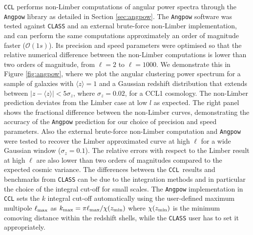 \documentclass[\docopts]{\docclass}
\newcommand{\ccl}{{\tt CCL}\xspace}
\newcommand{\class}{{\tt CLASS}\xspace}
\begin{document}
\ccl performs non-Limber computations of angular power spectra through the {\tt Angpow} library as detailed in Section \ref{sec:angpow}. The \texttt{Angpow} software was tested against \class and an external brute-force non-Limber implementation, and can perform the same computations approximately an order of magnitude faster ($\mathcal{O}(1s)$). Its precision and speed parameters were optimised so that the relative numerical difference between the non-Limber computations is lower than two orders of magnitude, from $\ell=2$ to $\ell=1000$. We demonstrate this in Figure \ref{fig:angpow}, where we plot the angular clustering power spectrum for a sample of galaxies with $\langle z \rangle=1$ and a Gaussian redshift distribution that extends between $|z-\langle z \rangle|<5\sigma_z$, where $\sigma_z=0.02$, for a CCL1 cosmology. The non-Limber prediction deviates from the Limber case at low $l$ as expected. The right panel shows the fractional difference between the non-Limber curves, demonstrating the accuracy of the {\tt Angpow} prediction for our choice of precision and speed parameters. Also the external brute-force non-Limber computation and {\tt Angpow} were tested to recover the Limber approximated curve at high $\ell$ for a wide Gaussian window ($\sigma_z=0.1$). The relative errors with respect to the Limber result at high $\ell$ are also lower than two orders of magnitudes compared to the expected cosmic variance. The differences between the \ccl~results and benchmarks from \class can be due to the integration methods and in particular the choice of the integral cut-off for small scales. The {\tt Angpow} implementation in \ccl sets the $k$ integral cut-off automatically using the user-defined maximum multipole $\ell_{\rm max}$ as $k_{\rm max}=\pi \ell_{\rm max} / \chi(z_{\rm min})$ where $\chi(z_{\rm min})$ is the minimum comoving distance within the redshift shells, while the \class user has to set it appropriately.
\end{document}
